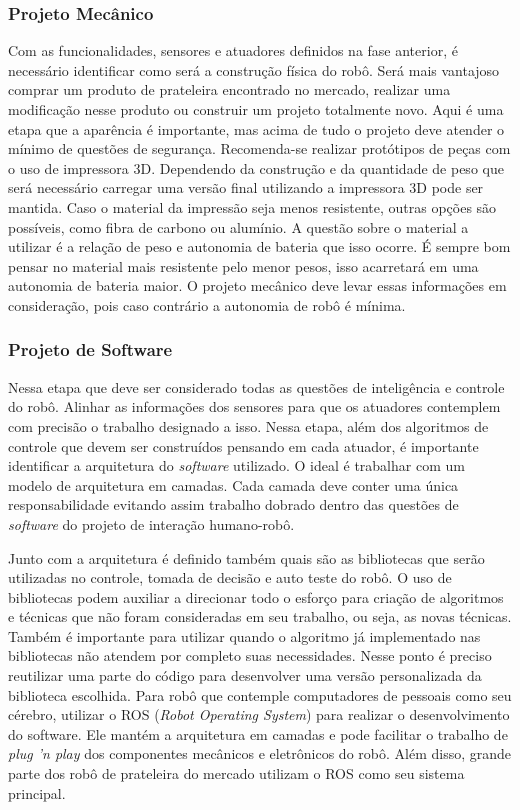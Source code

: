 \subsubsection{Projeto Mecânico}
\label{sec:mecanica}
Com as funcionalidades, sensores e atuadores definidos na fase anterior, é necessário identificar como será a construção física do robô. Será mais vantajoso comprar um produto de prateleira encontrado no mercado, realizar uma modificação nesse produto ou construir um projeto totalmente novo. Aqui é uma etapa que a aparência é importante, mas acima de tudo o projeto deve atender o mínimo de questões de segurança. Recomenda-se realizar protótipos de peças com o uso de impressora 3D. Dependendo da construção e da quantidade de peso que será necessário carregar uma versão final utilizando a impressora 3D pode ser mantida. Caso o material da impressão seja menos resistente, outras opções são possíveis, como fibra de carbono ou alumínio.  A questão sobre o material a utilizar é a relação de peso e autonomia de bateria que isso ocorre. É sempre bom pensar no material mais resistente pelo menor pesos, isso acarretará em uma autonomia de bateria maior. O projeto mecânico deve levar essas informações em consideração, pois caso contrário a autonomia de robô é mínima.

\subsubsection{Projeto de Software}
\label{sec:software}
Nessa etapa que deve ser considerado todas as questões de inteligência e controle do robô. Alinhar as informações dos sensores para que os atuadores contemplem com precisão o trabalho designado a isso. Nessa etapa, além dos algoritmos de controle que devem ser construídos pensando em cada atuador, é importante identificar a arquitetura do \textit{software} utilizado. O ideal é trabalhar com um modelo de arquitetura em camadas. Cada camada deve conter uma única responsabilidade evitando assim trabalho dobrado dentro das questões de \textit{software} do projeto de interação humano-robô.

Junto com a arquitetura é definido também quais são as bibliotecas que serão utilizadas no controle, tomada de decisão e auto teste do robô. O uso de bibliotecas podem auxiliar a direcionar todo o esforço para criação de algoritmos e técnicas que não foram consideradas em seu trabalho, ou seja, as novas técnicas. Também é importante para utilizar quando o algoritmo já implementado nas bibliotecas não atendem por completo suas necessidades. Nesse ponto é preciso reutilizar uma parte do código para desenvolver uma versão personalizada da biblioteca escolhida. Para robô que contemple computadores de pessoais como seu cérebro, utilizar o ROS (\textit{Robot Operating System}) para realizar o desenvolvimento do software. Ele mantém a arquitetura em camadas e pode facilitar o trabalho de \textit{plug 'n play} dos componentes mecânicos e eletrônicos do robô. Além disso, grande parte dos robô de prateleira do mercado utilizam o ROS como seu sistema principal.

